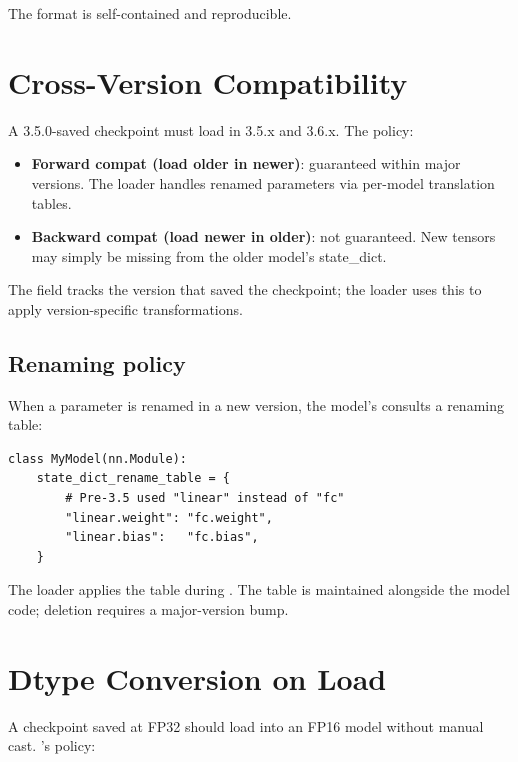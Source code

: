 The format is self-contained and reproducible.

\section{Cross-Version Compatibility}
\label{sec:serialization:cross_version}

A 3.5.0-saved checkpoint must load in 3.5.x and 3.6.x. The
policy:

\begin{itemize}
  \item \textbf{Forward compat (load older in newer)}:
    guaranteed within major versions. The loader handles
    renamed parameters via per-model translation tables.
  \item \textbf{Backward compat (load newer in older)}: not
    guaranteed. New tensors may simply be missing from the
    older model's state\_dict.
\end{itemize}

The  field tracks the version that
saved the checkpoint; the loader uses this to apply
version-specific transformations.

\subsection{Renaming policy}
\label{ssec:serialization:renaming_policy}

When a parameter is renamed in a new version, the model's
 consults a renaming table:

\begin{lstlisting}[style=lucid,language=LucidPython]
class MyModel(nn.Module):
    state_dict_rename_table = {
        # Pre-3.5 used "linear" instead of "fc"
        "linear.weight": "fc.weight",
        "linear.bias":   "fc.bias",
    }
\end{lstlisting}

The loader applies the table during .
The table is maintained alongside the model code; deletion
requires a major-version bump.

\section{Dtype Conversion on Load}
\label{sec:serialization:dtype_conversion}

A checkpoint saved at FP32 should load into an FP16 model
without manual cast. \Lucid's policy:

